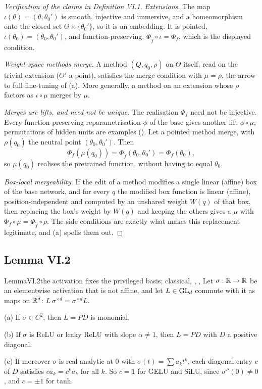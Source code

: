 \begin{proof}[Verification of the claims in Definition VI.1]
\emph{Extensions.} The map $\iota(\theta)=(\theta,\theta_0')$ is smooth, injective and immersive, and a homeomorphism onto the
closed set $\Theta\times\{\theta_0'\}$, so it is an embedding. It is pointed, $\iota(\theta_0)=(\theta_0,\theta_0')$, and
function-preserving, $\Phi_{\tilde f}\circ\iota=\Phi_f$, which is the displayed condition.

\emph{Weight-space methods merge.} A method $(Q,q_0,\rho)$ on $\Theta$ itself, read on the trivial extension
($\Theta'$ a point), satisfies the merge condition with $\mu=\rho$, the arrow to full fine-tuning of
(a). More generally, a method on an extension whose $\rho$ factors as $\iota\circ\mu$ merges by
$\mu$.

\emph{Merges are lifts, and need not be unique.} The realisation $\Phi_f$ need not be injective. Every function-preserving
reparametrisation $\phi$ of the base gives another lift $\phi\circ\mu$; permutations of hidden units are examples
().
Let a pointed method merge, with $\rho(q_0)$ the neutral point $(\theta_0,\theta_0')$. Then
\[\Phi_f(\mu(q_0))=\Phi_{\tilde f}(\theta_0,\theta_0')=\Phi_f(\theta_0),\]
so $\mu(q_0)$ realises the pretrained function, without having to equal $\theta_0$.

\emph{Box-local mergeability.} If the edit of a method modifies a single linear (affine) box of the base network, and for
every $q$ the modified box function is linear (affine), position-independent and computed by an unshared weight $W(q)$ of
that box, then replacing the box's weight by $W(q)$ and keeping the others gives a $\mu$ with $\Phi_f\circ\mu=\Phi_{\tilde
f}\circ\rho$. The side conditions are exactly what makes this replacement legitimate, and (a)
spells them out.
\end{proof}

\subsection{Lemma VI.2}\label{proof:VI.2}

\begin{restate}{Lemma}{VI.2}{the activation fixes the privileged basis; classical, \citet{xsussmann1992uniqueness},
\citet{xchen1993geometry}, \citet{xgodfrey2022symmetries}}
Let $\sigma:\mathbb{R}\to\mathbb{R}$ be an elementwise activation that is not affine, and let $L\in\mathrm{GL}_d$ commute with it as maps on $\mathbb{R}^d$:
$L\,\sigma^{\times d}=\sigma^{\times d}L$.

(a) If $\sigma\in C^2$, then $L=PD$ is monomial.

(b) If $\sigma$ is ReLU or leaky ReLU with slope $\alpha\ne1$, then $L=PD$ with $D$ a positive diagonal.

(c) If moreover $\sigma$ is real-analytic at $0$ with $\sigma(t)=\sum a_kt^k$, each diagonal entry $c$ of $D$ satisfies
$ca_k=c^ka_k$ for all $k$. So $c=1$ for GELU and SiLU, since $\sigma''(0)\neq0$, and $c=\pm1$ for tanh.
\end{restate}

